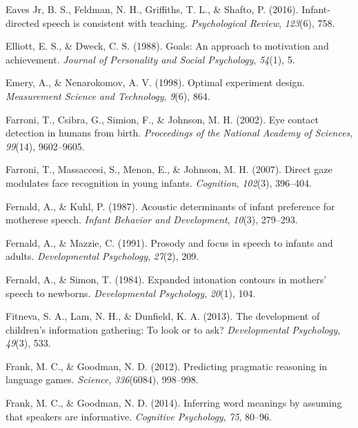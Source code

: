 \documentclass[english,floatsintext,man]{apa6}
\theoremstyle{definition}
\theoremstyle{definition}
\theoremstyle{definition}
\theoremstyle{remark}
\begin{document}
\hypertarget{ref-eaves2016infant}{}
Eaves Jr, B. S., Feldman, N. H., Griffiths, T. L., \& Shafto, P. (2016).
Infant-directed speech is consistent with teaching. \emph{Psychological
Review}, \emph{123}(6), 758.

\hypertarget{ref-elliott1988goals}{}
Elliott, E. S., \& Dweck, C. S. (1988). Goals: An approach to motivation
and achievement. \emph{Journal of Personality and Social Psychology},
\emph{54}(1), 5.

\hypertarget{ref-emery1998optimal}{}
Emery, A., \& Nenarokomov, A. V. (1998). Optimal experiment design.
\emph{Measurement Science and Technology}, \emph{9}(6), 864.

\hypertarget{ref-farroni2002eye}{}
Farroni, T., Csibra, G., Simion, F., \& Johnson, M. H. (2002). Eye
contact detection in humans from birth. \emph{Proceedings of the
National Academy of Sciences}, \emph{99}(14), 9602--9605.

\hypertarget{ref-farroni2007direct}{}
Farroni, T., Massaccesi, S., Menon, E., \& Johnson, M. H. (2007). Direct
gaze modulates face recognition in young infants. \emph{Cognition},
\emph{102}(3), 396--404.

\hypertarget{ref-fernald1987acoustic}{}
Fernald, A., \& Kuhl, P. (1987). Acoustic determinants of infant
preference for motherese speech. \emph{Infant Behavior and Development},
\emph{10}(3), 279--293.

\hypertarget{ref-fernald1991prosody}{}
Fernald, A., \& Mazzie, C. (1991). Prosody and focus in speech to
infants and adults. \emph{Developmental Psychology}, \emph{27}(2), 209.

\hypertarget{ref-fernald1984expanded}{}
Fernald, A., \& Simon, T. (1984). Expanded intonation contours in
mothers' speech to newborns. \emph{Developmental Psychology},
\emph{20}(1), 104.

\hypertarget{ref-fitneva2013development}{}
Fitneva, S. A., Lam, N. H., \& Dunfield, K. A. (2013). The development
of children's information gathering: To look or to ask?
\emph{Developmental Psychology}, \emph{49}(3), 533.

\hypertarget{ref-frank2012predicting}{}
Frank, M. C., \& Goodman, N. D. (2012). Predicting pragmatic reasoning
in language games. \emph{Science}, \emph{336}(6084), 998--998.

\hypertarget{ref-frank2014inferring}{}
Frank, M. C., \& Goodman, N. D. (2014). Inferring word meanings by
assuming that speakers are informative. \emph{Cognitive Psychology},
\emph{75}, 80--96.
\end{document}

